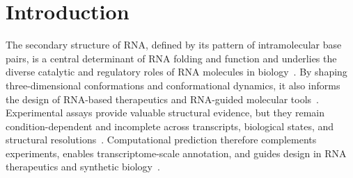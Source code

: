 \documentclass[pdflatex,sn-mathphys-num]{sn-jnl}%
\theoremstyle{thmstyleone}%
\theoremstyle{thmstyletwo}%
\theoremstyle{thmstylethree}%
\begin{document}
\maketitle

\section{Introduction}\label{sec:intro}

The secondary structure of RNA, defined by its pattern of intramolecular base pairs, is a central determinant of RNA folding and function and underlies the diverse catalytic and regulatory roles of RNA molecules in biology~\cite{tinoco1999how,mortimer2014insights,kruger1982self,doudna2002although,isaacs2006rna}.
By shaping three-dimensional conformations and conformational dynamics, it also informs the design of RNA-based therapeutics and RNA-guided molecular tools~\cite{dethoff2012functional,sullenger2016from,pardi2024mrna,jinek2013rna}.
Experimental assays provide valuable structural evidence, but they remain condition-dependent and incomplete across transcripts, biological states, and structural resolutions~\cite{ding2014in,rouskin2014genome,spitale2015structural,bevilacqua2016genome}.
Computational prediction therefore complements experiments, enables transcriptome-scale annotation, and guides design in RNA therapeutics and synthetic biology~\cite{sato2023recent,wang2023uni}.
\end{document}
